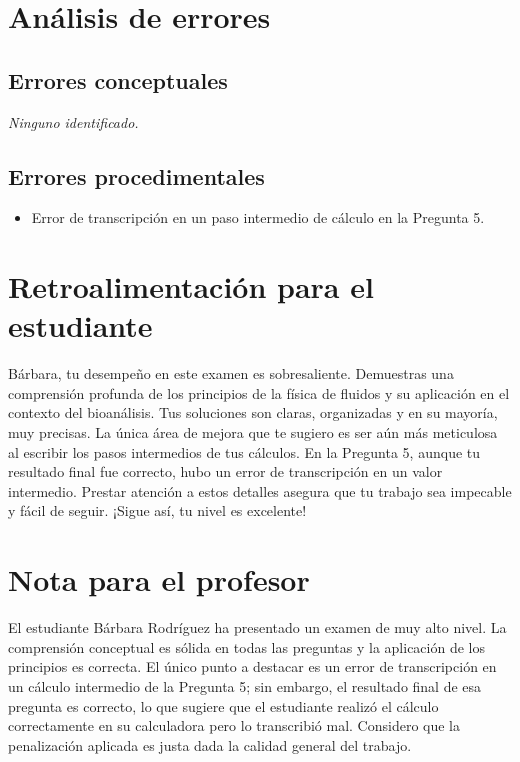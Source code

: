 \documentclass[11pt,a4paper]{article}
\begin{document}
\section*{Análisis de errores}

\subsection*{Errores conceptuales}
\textit{Ninguno identificado.}

\subsection*{Errores procedimentales}
\begin{itemize}[leftmargin=1.5em, itemsep=2pt]
  \item Error de transcripción en un paso intermedio de cálculo en la Pregunta 5.
\end{itemize}

\section*{Retroalimentación para el estudiante}
\begin{tcolorbox}[cajaRecomendacion, title={Dirigido a: barbara rodriguez 32640760}]
Bárbara, tu desempeño en este examen es sobresaliente. Demuestras una comprensión profunda de los principios de la física de fluidos y su aplicación en el contexto del bioanálisis. Tus soluciones son claras, organizadas y en su mayoría, muy precisas. La única área de mejora que te sugiero es ser aún más meticulosa al escribir los pasos intermedios de tus cálculos. En la Pregunta 5, aunque tu resultado final fue correcto, hubo un error de transcripción en un valor intermedio. Prestar atención a estos detalles asegura que tu trabajo sea impecable y fácil de seguir. ¡Sigue así, tu nivel es excelente!
\end{tcolorbox}

\section*{Nota para el profesor}
\begin{tcolorbox}[
  enhanced, breakable,
  colback=yellow!8, colframe=yellow!60!black,
  fonttitle=\bfseries, coltitle=black,
  title={Observaciones para revisión manual},
  top=4pt, bottom=4pt, left=8pt, right=8pt,
]
El estudiante Bárbara Rodríguez ha presentado un examen de muy alto nivel. La comprensión conceptual es sólida en todas las preguntas y la aplicación de los principios es correcta. El único punto a destacar es un error de transcripción en un cálculo intermedio de la Pregunta 5; sin embargo, el resultado final de esa pregunta es correcto, lo que sugiere que el estudiante realizó el cálculo correctamente en su calculadora pero lo transcribió mal. Considero que la penalización aplicada es justa dada la calidad general del trabajo.
\end{tcolorbox}
\end{document}
